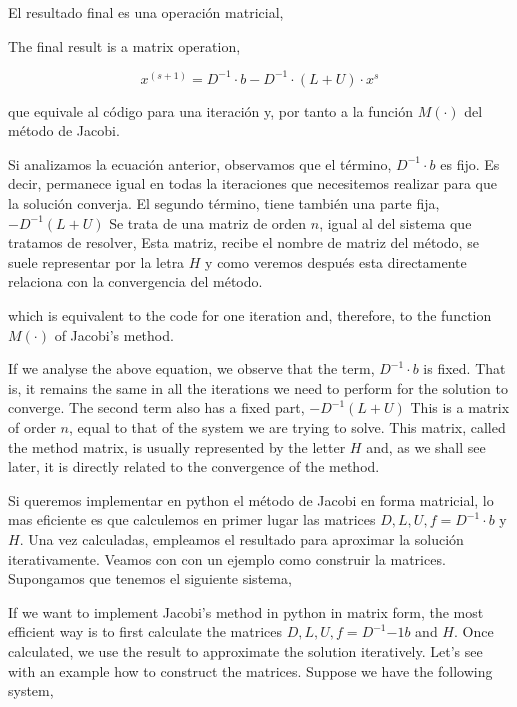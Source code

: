 \begin{paracol}{2}

El resultado final es una operación matricial,

\switchcolumn
The final result is a matrix operation,
\end{paracol}

\begin{equation*}
x^{(s+1)}=D^{-1}\cdot b- D^{-1}\cdot\left(L+U\right)\cdot x^s
\end{equation*}

\begin{paracol}{2}
que equivale al código para una iteración y, por tanto a la función $M(\cdot)$ del método de Jacobi. 

Si analizamos la ecuación anterior, observamos que el término, $D^{-1}\cdot b$ es fijo. Es decir, permanece igual en todas la iteraciones que necesitemos realizar para que la solución converja. El segundo término, tiene también una parte fija, $-D^{-1}(L+U)$ Se trata de una matriz de orden $n$, igual al del sistema que tratamos de resolver, Esta matriz, recibe el nombre de matriz del método, se suele representar por la letra $H$ y como veremos después esta directamente relaciona con la convergencia del método.

\switchcolumn
which is equivalent to the code for one iteration and, therefore, to the function $M(\cdot)$ of Jacobi's method. 

If we analyse the above equation, we observe that the term, $D^{-1}\cdot b$ is fixed. That is, it remains the same in all the iterations we need to perform for the solution to converge. The second term also has a fixed part, $-D^{-1}(L+U)$ This is a matrix of order $n$, equal to that of the system we are trying to solve. This matrix, called the method matrix, is usually represented by the letter $H$ and, as we shall see later, it is directly related to the convergence of the method.

\switchcolumn

Si queremos implementar en python el método de Jacobi en forma matricial, lo mas eficiente es que calculemos en primer lugar las matrices $D, L, U, f=D^{-1}\cdot b$ y $H$. Una vez calculadas, empleamos el resultado para aproximar la solución iterativamente. Veamos con con un ejemplo como construir la matrices. Supongamos que tenemos el siguiente sistema,

\switchcolumn

If we want to implement Jacobi's method in python in matrix form, the most efficient way is to first calculate the matrices $D, L, U, f=D^{-1}{-1} b$ and $H$. Once calculated, we use the result to approximate the solution iteratively. Let's see with an example how to construct the matrices. Suppose we have the following system,

\end{paracol}

